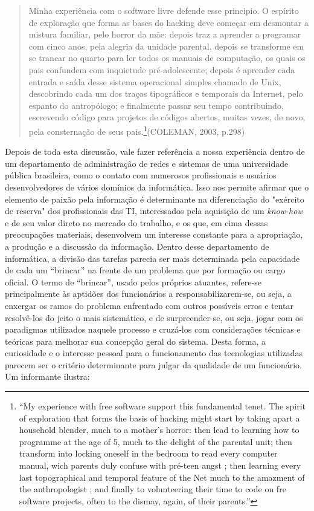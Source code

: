 \begin{quote}
Minha experiência com o software livre defende esse principio. O espírito de exploração que forma as bases do hacking deve começar em desmontar a mistura familiar, pelo horror da mãe: depois traz a aprender a programar com cinco anos, pela alegria da unidade parental, depois se transforme em se trancar no quarto para ler todos os manuais de computação, os quais os pais confundem com inquietude pré-adolescente; depois é aprender cada entrada e saída desse sistema operacional simples chamado de Unix, descobrindo cada um dos traços tipográficos e temporais da Internet, pelo espanto do antropólogo; e finalmente passar seu tempo contribuindo, escrevendo código para projetos de códigos abertos, muitas vezes, de novo, pela consternação de seus pais.\footnote{“My experience with free software support this fundamental tenet. The spirit of exploration that forms the basis of hacking might start by taking apart a household blender, much to a mother’s horror: then lead to learning how to programme at the age of 5, much to the delight of the parental unit; then transform into locking oneself in the bedroom to read every computer manual, wich parents duly confuse with pré-teen angst ; then learning every last topographical and temporal feature of the Net much to the amazment of the anthropologist ; and finally to volunteering their time to code on fre software projects, often to the dismay, again, of their parents.”}(COLEMAN, 2003, p.298)
\end{quote}

Depois de toda esta discussão, vale fazer referência a nossa experiência dentro de um departamento de administração de redes e sistemas de uma universidade pública brasileira, como o contato com numerosos profissionais e usuários desenvolvedores de vários domínios da informática. Isso nos permite afirmar que o elemento de paixão pela informação é determinante na diferenciação do "exército de reserva" dos profissionais das TI, interessados pela aquisição de um \emph{know-how} e de seu valor direto no mercado do trabalho, e os que, em cima dessas preocupações materiais, desenvolvem um interesse constante para a apropriação, a produção e a discussão da informação. Dentro desse departamento de informática, a divisão das tarefas parecia ser mais determinada pela capacidade de cada um “brincar” na frente de um problema que por formação ou cargo oficial. O termo de “brincar”, usado pelos próprios atuantes, refere-se principalmente às aptidões dos funcionários a responsabilizarem-se, ou seja, a enxergar os ramos do problema enfrentado com outros possíveis erros e tentar resolvê-los do jeito o mais sistemático, e de surpreender-se, ou seja, jogar com os paradigmas utilizados naquele processo e cruzá-los com considerações técnicas e teóricas para melhorar sua concepção geral do sistema. Desta forma, a curiosidade e o interesse pessoal para o funcionamento das tecnologias utilizadas parecem ser o critério determinante para julgar da qualidade de um funcionário. Um informante ilustra:

